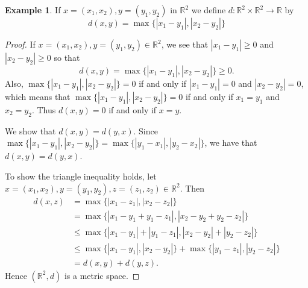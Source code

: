 \documentclass[11pt,a4paper]{article}
\theoremstyle{definition}
\newtheorem{exa}[thm]{Example}
\begin{document}
\begin{exa}
If $x=(x_1,x_2),y=(y_1,y_2)$ in $\mathbb{R}^2$ we define $d:\mathbb{R}^2\times \mathbb{R}^2\rightarrow \mathbb{R}$ by $$d(x,y)=\max\{|x_1-y_1|,|x_2-y_2|\}$$
\end{exa}
\begin{proof}
If $x=(x_1,x_2),y=(y_1,y_2)\in \mathbb{R}^2$, we see that $|x_1-y_1|\geq 0$ and $|x_2-y_2|\geq 0$ so that $$d(x,y)=\max\{|x_1-y_1|,|x_2-y_2|\}\geq 0.$$
Also, $\max\{|x_1-y_1|,|x_2-y_2|\}=0$ if and only if $|x_1-y_1|=0$ and $|x_2-y_2|=0$, which means that $\max\{|x_1-y_1|,|x_2-y_2|\}=0$ if and only if $x_1=y_1$ and $x_2=y_2$. Thus $d(x,y)=0$ if and only if $x=y$.

We show that $d(x,y)=d(y,x)$. Since $\max\{|x_1-y_1|,|x_2-y_2|\}=\max\{|y_1-x_1|,|y_2-x_2|\}$, we have that $d(x,y)=d(y,x)$.

To show the triangle inequality holds, let $x=(x_1,x_2), y=(y_1,y_2), z=(z_1,z_2)\in \mathbb{R}^2$. Then
\begin{align*}
d(x,z) &=\max\{|x_1-z_1|,|x_2-z_2|\}\\
       &=\max\{|x_1-y_1+y_1-z_1|,|x_2-y_2+y_2-z_2|\}\\
       &\leq \max\{|x_1-y_1|+|y_1-z_1|,|x_2-y_2|+|y_2-z_2|\}\\
       &\leq \max\{|x_1-y_1|,|x_2-y_2|\}+\max\{|y_1-z_1|,|y_2-z_2|\}\\
       &=d(x,y)+d(y,z).
\end{align*}
Hence $(\mathbb{R}^2,d)$ is a metric space.

\end{proof}
\end{document}
